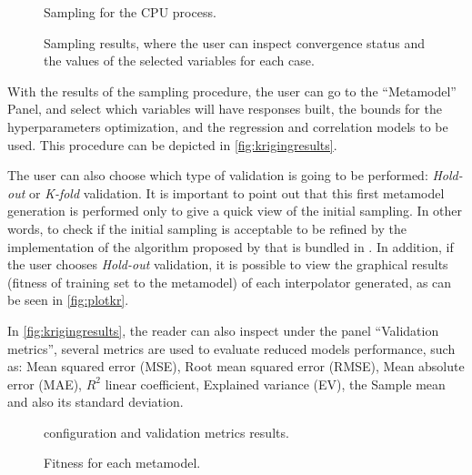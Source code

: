 \documentclass[../../msc-thesis.tex]{subfiles}
\begin{document}
\begin{figure}[htb]
    \centering
    \caption{\mtc Sampling for the CPU process.}
    \label{fig:lhs4}
\end{figure}


\begin{figure}[htb]
    \centering
    \caption{Sampling results, where the user can inspect convergence 
    status and the values of the selected variables for each case.}
    \label{fig:lhs5}
\end{figure}

With the results of the sampling procedure, the user can go to the 
``Metamodel'' Panel, and select which variables will have \kriging responses 
built, the bounds for the \kriging hyperparameters optimization, and the 
regression and correlation models to be used. This procedure can be depicted 
in \autoref{fig:krigingresults}.

The user can also choose which type of validation is going to be performed:
\textit{Hold-out} or \textit{K-fold} validation. It is important to point 
out that this first metamodel generation is performed only to give a 
quick view of the initial sampling. In other words, to check if the initial 
sampling is acceptable to be refined by the implementation of the algorithm 
proposed by \textcite{Caballero2008} that is bundled in \mtc. In addition, 
if the user chooses \textit{Hold-out} validation, it is possible to view 
the graphical results (fitness of training set to the metamodel) of each 
\kriging interpolator generated, as can be seen in \autoref{fig:plotkr}.

In \autoref{fig:krigingresults}, the reader can also inspect under the
panel ``Validation metrics'', several metrics are used to evaluate reduced 
models performance, such as: Mean squared error (MSE), Root mean squared 
error (RMSE), Mean absolute error (MAE), $R^{2}$ linear coefficient,
Explained variance (EV), the Sample mean and also its standard deviation.

\begin{figure}[htb]
    \centering
    \caption{\kriging configuration and validation metrics results.}
    \label{fig:krigingresults}
\end{figure}

\begin{figure}[htb]
    \centering
    \caption{Fitness for each metamodel.}
    \label{fig:plotkr}
\end{figure}
\end{document}
